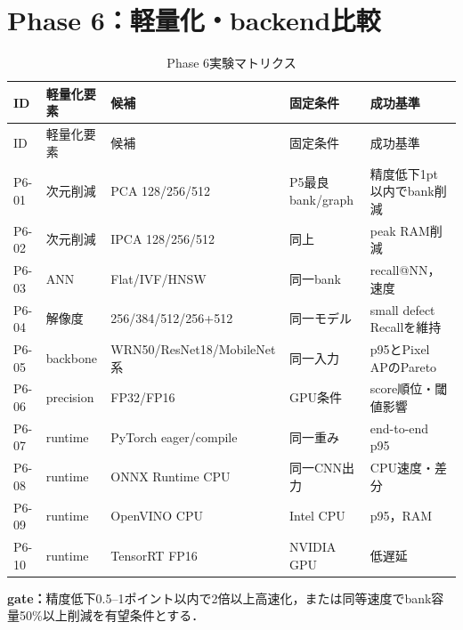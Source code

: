 \documentclass[a4paper,11pt]{ltjsarticle}
\begin{document}
\section{Phase 6：軽量化・backend比較}
\begin{landscape}
\begin{longtable}{L{18mm}L{40mm}L{42mm}L{45mm}L{55mm}}
\caption{Phase 6実験マトリクス}\\
\toprule
ID & 軽量化要素 & 候補 & 固定条件 & 成功基準 \\
\midrule
\endfirsthead
\toprule
ID & 軽量化要素 & 候補 & 固定条件 & 成功基準 \\
\midrule
\endhead
P6-01 & 次元削減 & PCA 128/256/512 & P5最良bank/graph & 精度低下1pt以内でbank削減 \\
P6-02 & 次元削減 & IPCA 128/256/512 & 同上 & peak RAM削減 \\
P6-03 & ANN & Flat/IVF/HNSW & 同一bank & recall@NN，速度 \\
P6-04 & 解像度 & 256/384/512/256+512 & 同一モデル & small defect Recallを維持 \\
P6-05 & backbone & WRN50/ResNet18/MobileNet系 & 同一入力 & p95とPixel APのPareto \\
P6-06 & precision & FP32/FP16 & GPU条件 & score順位・閾値影響 \\
P6-07 & runtime & PyTorch eager/compile & 同一重み & end-to-end p95 \\
P6-08 & runtime & ONNX Runtime CPU & 同一CNN出力 & CPU速度・差分 \\
P6-09 & runtime & OpenVINO CPU & Intel CPU & p95，RAM \\
P6-10 & runtime & TensorRT FP16 & NVIDIA GPU & 低遅延 \\
\bottomrule
\end{longtable}
\end{landscape}
\textbf{gate：}精度低下0.5--1ポイント以内で2倍以上高速化，または同等速度でbank容量50\%以上削減を有望条件とする．
\end{document}
